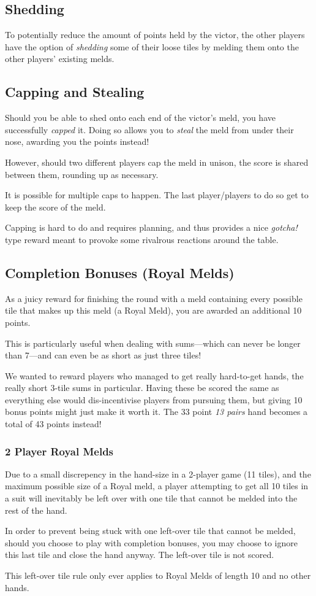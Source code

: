 \subsection{Shedding}
To potentially reduce the amount of points held by the victor, the other players have the option of \textit{shedding} some of their loose tiles by melding them onto the other players' existing melds.

\subsection{Capping and Stealing}
Should you be able to shed onto each end of the victor's meld, you have successfully \textit{capped} it. Doing so allows you to \textit{steal} the meld from under their nose, awarding you the points instead!

However, should two different players cap the meld in unison, the score is shared between them, rounding up as necessary.

\note It is possible for multiple caps to happen. The last player/players to do so get to keep the score of the meld.

\aside Capping is hard to do and requires planning, and thus provides a nice \textit{gotcha!} type reward meant to provoke some rivalrous reactions around the table.

\subsection{Completion Bonuses (Royal Melds)}
As a juicy reward for finishing the round with a meld containing every possible tile that makes up this meld (a Royal Meld), you are awarded an additional 10 points.

This is particularly useful when dealing with sums---which can never be longer than 7---and can even be as short as just three tiles!

\aside We wanted to reward players who managed to get really hard-to-get hands, the really short 3-tile sums in particular. Having these be scored the same as everything else would dis-incentivise players from pursuing them, but giving 10 bonus points might just make it worth it. The 33 point \textit{13 pairs} hand becomes a total of 43 points instead!

\subsubsection{2 Player Royal Melds}
Due to a small discrepency in the hand-size in a 2-player game (11 tiles), and the maximum possible size of a Royal meld, a player attempting to get all 10 tiles in a suit will inevitably be left over with one tile that cannot be melded into the rest of the hand.

In order to prevent being stuck with one left-over tile that cannot be melded, should you choose to play with completion bonuses, you may choose to ignore this last tile and close the hand anyway. The left-over tile is not scored.

\note This left-over tile rule only ever applies to Royal Melds of length 10 and no other hands.
